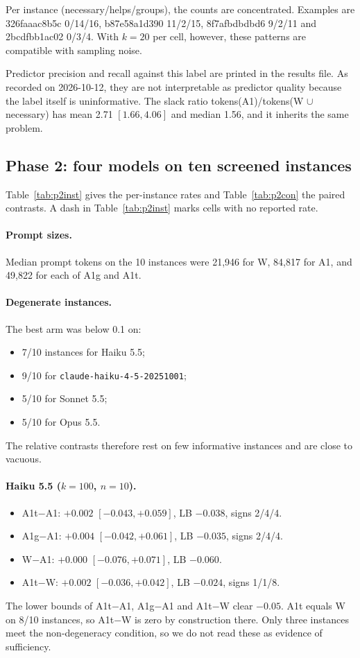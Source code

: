 \documentclass[10pt]{article}
\begin{document}
Per instance (necessary/helps/groups), the counts are concentrated. Examples are 326faaac8b5c 0/14/16, b87e58a1d390 11/2/15, 8f7afbdbdbd6 9/2/11 and 2bcdfbb1ac02 0/3/4. With $k=20$ per cell, however, these patterns are compatible with sampling noise.

Predictor precision and recall against this label are printed in the results file. As recorded on 2026-10-12, they are not interpretable as predictor quality because the label itself is uninformative. The slack ratio tokens(A1)/tokens(W $\cup$ necessary) has mean 2.71 $[1.66, 4.06]$ and median 1.56, and it inherits the same problem.

\subsection{Phase 2: four models on ten screened instances}

Table~\ref{tab:p2inst} gives the per-instance rates and Table~\ref{tab:p2con} the paired contrasts. A dash in Table~\ref{tab:p2inst} marks cells with no reported rate.

\paragraph{Prompt sizes.} Median prompt tokens on the 10 instances were 21,946 for W, 84,817 for A1, and 49,822 for each of A1g and A1t.

\paragraph{Degenerate instances.} The best arm was below 0.1 on:
\begin{itemize}
\item 7/10 instances for Haiku 5.5;
\item 9/10 for \texttt{claude-haiku-4-5-20251001};
\item 5/10 for Sonnet 5.5;
\item 5/10 for Opus 5.5.
\end{itemize}
The relative contrasts therefore rest on few informative instances and are close to vacuous.

\paragraph{Haiku 5.5 ($k=100$, $n=10$).}
\begin{itemize}
\item A1t$-$A1: $+0.002$ $[-0.043, +0.059]$, LB $-0.038$, signs 2/4/4.
\item A1g$-$A1: $+0.004$ $[-0.042, +0.061]$, LB $-0.035$, signs 2/4/4.
\item W$-$A1: $+0.000$ $[-0.076, +0.071]$, LB $-0.060$.
\item A1t$-$W: $+0.002$ $[-0.036, +0.042]$, LB $-0.024$, signs 1/1/8.
\end{itemize}
The lower bounds of A1t$-$A1, A1g$-$A1 and A1t$-$W clear $-0.05$. A1t equals W on 8/10 instances, so A1t$-$W is zero by construction there. Only three instances meet the non-degeneracy condition, so we do not read these as evidence of sufficiency.
\end{document}
